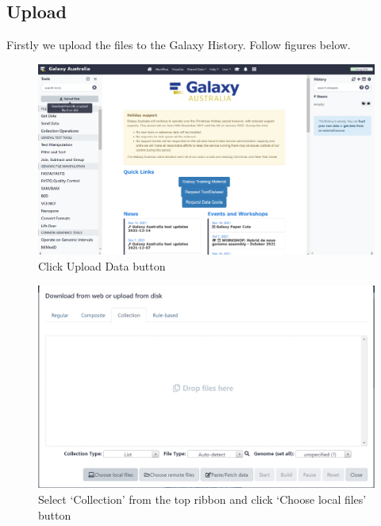 \documentclass[
]{book}
\begin{document}
\hypertarget{upload}{%
\subsection{Upload}\label{upload}}

Firstly we upload the files to the Galaxy History. Follow figures below.

\begin{figure}

{\centering \includegraphics[width=1\linewidth]{images/image001} 

}

\caption{Click Upload Data button}\label{fig:chunk1}
\end{figure}

\begin{figure}

{\centering \includegraphics[width=1\linewidth]{images/image002} 

}

\caption{Select ‘Collection’ from the top ribbon and click ‘Choose local files’ button}\label{fig:chunk2}
\end{figure}
\end{document}
